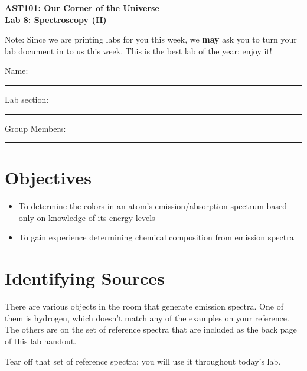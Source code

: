 \documentclass[11pt]{article}
\begin{document}
\begin{center}
\textbf{\Large
AST101: Our Corner of the Universe \\
\vspace*{0.1cm}
Lab 8: Spectroscopy (II)
}

\color{red} Note: Since we are printing labs for you this week, we {\bf may} ask you to turn your lab document in to us this week. This is the best lab of the year; enjoy it!
\end{center}


\vspace*{0.5cm}

{\Large Name:}\vspace*{0.5cm}\\\hrule
{\Large Lab section:}\vspace*{0.5cm}\\\hrule
{\Large Group Members:}\vspace*{0.5cm}\\\hrule
\vspace*{0.5cm}


\section{Objectives}
\begin{itemize}
	\item To determine the colors in an atom's emission/absorption spectrum based only on knowledge of its energy levels
	\item To gain experience determining chemical composition from emission spectra
\end{itemize}



\section{Identifying Sources}


There are various objects in the room that generate emission spectra. One of them is hydrogen, which doesn't match any of the examples
on your reference. The others are on the set of reference spectra that are included as the back page of this lab handout. 

{\color{red}Tear off that set of reference spectra; you will use it throughout today's lab. }
\end{document}
